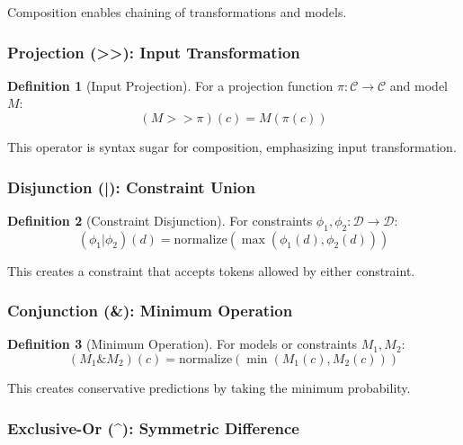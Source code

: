 \documentclass{article}
\theoremstyle{definition}
\newtheorem{definition}{Definition}
\begin{document}
Composition enables chaining of transformations and models.

\subsubsection{Projection (>>): Input Transformation}

\begin{definition}[Input Projection]
For a projection function $\pi: \mathcal{C} \rightarrow \mathcal{C}$ and model $M$:
\begin{equation}
(M >> \pi)(c) = M(\pi(c))
\end{equation}
\end{definition}

This operator is syntax sugar for composition, emphasizing input transformation.

\subsubsection{Disjunction (|): Constraint Union}

\begin{definition}[Constraint Disjunction]
For constraints $\phi_1, \phi_2: \mathcal{D} \rightarrow \mathcal{D}$:
\begin{equation}
(\phi_1 | \phi_2)(d) = \text{normalize}(\max(\phi_1(d), \phi_2(d)))
\end{equation}
\end{definition}

This creates a constraint that accepts tokens allowed by either constraint.

\subsubsection{Conjunction (\&): Minimum Operation}

\begin{definition}[Minimum Operation]
For models or constraints $M_1, M_2$:
\begin{equation}
(M_1 \& M_2)(c) = \text{normalize}(\min(M_1(c), M_2(c)))
\end{equation}
\end{definition}

This creates conservative predictions by taking the minimum probability.

\subsubsection{Exclusive-Or (\^{}): Symmetric Difference}
\end{document}
